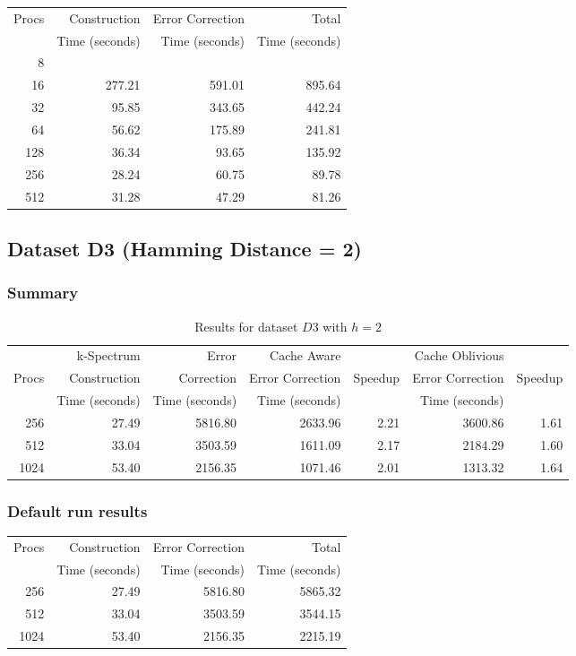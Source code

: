 \documentclass[integrals, nointegrals, article, 12pt, a4paper]{article}
\begin{document}
\begin{center}
\begin{tabular}{rrrr}
\hline
Procs & Construction & Error Correction & Total\\
 & Time (seconds) & Time (seconds) & Time (seconds)\\
\hline
8 &  &  & \\
16 & 277.21 & 591.01 & 895.64\\
32 & 95.85 & 343.65 & 442.24\\
64 & 56.62 & 175.89 & 241.81\\
128 & 36.34 & 93.65 & 135.92\\
256 & 28.24 & 60.75 & 89.78\\
512 & 31.28 & 47.29 & 81.26\\
\hline
\end{tabular}
\end{center}
\subsection{Dataset D3 (Hamming Distance = 2)}
\label{sec-3-5}
\subsubsection{Summary}
\label{sec-3-5-1}
\begin{table}[htb]
\caption{\label{tab:d3h2run}Results for dataset $D3$ with $h = 2$}
\centering
\begin{tabular}{rrrrrrr}
\hline
 & k-Spectrum & Error & Cache Aware &  & Cache Oblivious & \\
Procs & Construction & Correction & Error Correction & Speedup & Error Correction & Speedup\\
 & Time (seconds) & Time (seconds) & Time (seconds) &  & Time (seconds) & \\
\hline
256 & 27.49 & 5816.80 & 2633.96 & 2.21 & 3600.86 & 1.61\\
512 & 33.04 & 3503.59 & 1611.09 & 2.17 & 2184.29 & 1.60\\
1024 & 53.40 & 2156.35 & 1071.46 & 2.01 & 1313.32 & 1.64\\
\hline
\end{tabular}
\end{table}
\subsubsection{Default run results}
\label{sec-3-5-2}

\begin{center}
\begin{tabular}{rrrr}
\hline
Procs & Construction & Error Correction & Total\\
 & Time (seconds) & Time (seconds) & Time (seconds)\\
\hline
256 & 27.49 & 5816.80 & 5865.32\\
512 & 33.04 & 3503.59 & 3544.15\\
1024 & 53.40 & 2156.35 & 2215.19\\
\hline
\end{tabular}
\end{center}
\end{document}
